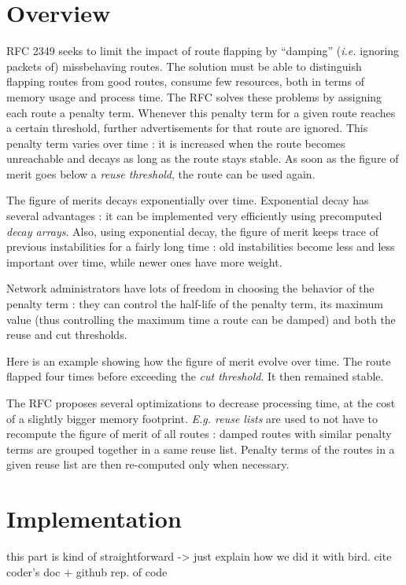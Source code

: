 \documentclass[a4paper,english]{IEEEtran}
\begin{document}
\section{Overview}

RFC 2349 seeks to limit the impact of route flapping by ``damping'' (\textit{i.e.} ignoring packets of) missbehaving routes.
The solution must be able to distinguish flapping routes from good routes, consume few resources, both in terms of memory usage and process time.
The RFC solves these problems by assigning each route a penalty term.
Whenever this penalty term for a given route reaches a certain threshold, further advertisements for that route are ignored.
This penalty term varies over time : it is increased when the route becomes unreachable and decays as long as the route stays stable.
As soon as the figure of merit goes below a \textit{reuse threshold}, the route can be used again.

The figure of merits decays exponentially over time.
Exponential decay has several advantages : it can be implemented very efficiently using precomputed \textit{decay arrays}.
Also, using exponential decay, the figure of merit keeps trace of previous instabilities for a fairly long time : old instabilities become less and less important over time, while newer ones have more weight.

Network administrators have lots of freedom in choosing the behavior of the penalty term : they can control the half-life of the penalty term, its maximum value (thus controlling the maximum time a route can be damped) and both the reuse and cut thresholds.

Here is an example showing how the figure of merit evolve over time.
The route flapped four times before exceeding the \textit{cut threshold}.
It then remained stable.

The RFC proposes several optimizations to decrease processing time, at the cost of a slightly bigger memory footprint.
\textit{E.g. reuse lists} are used to not have to recompute the figure of merit of all routes : damped routes with similar penalty terms are grouped together in a same reuse list.
Penalty terms of the routes in a given reuse list are then re-computed only when necessary.

\section{Implementation}

this part is kind of straightforward -> just explain how we did it
with bird. cite coder's doc + github rep. of code
\end{document}
